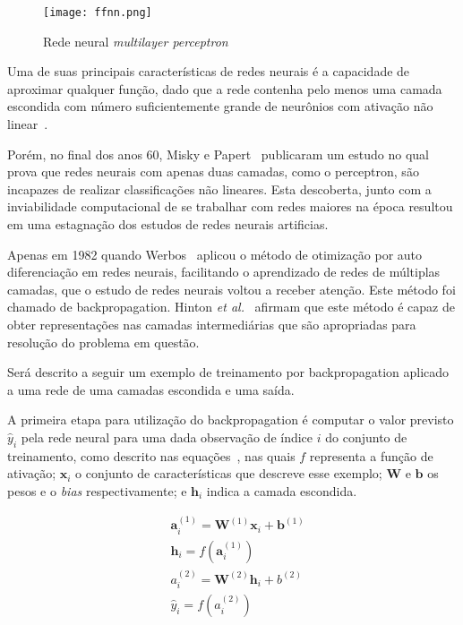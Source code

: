 \begin{figure}
\begin{center} {
    \begin{center}
    \texttt{[image: ffnn.png]}
    \caption{Rede neural \textit{multilayer perceptron}}
    \label{fig:ff-neural-net}
    \end{center}
}
\end{center}
\end{figure}

Uma de suas principais características de redes neurais é a capacidade de aproximar qualquer função, dado que a rede
contenha pelo menos uma camada escondida com número suficientemente grande de neurônios com ativação não
linear~\cite{hornik89}.

Porém, no final dos anos 60, Misky e Papert~\cite{minsky72} publicaram um estudo no qual prova que redes neurais com
apenas duas camadas, como o perceptron, são incapazes de realizar classificações não lineares.
Esta descoberta, junto com a inviabilidade computacional de se trabalhar com redes maiores na época resultou em uma
estagnação dos estudos de redes neurais artificias.

Apenas em 1982 quando Werbos~\cite{werbos82} aplicou o método de otimização por auto diferenciação em redes neurais,
facilitando o aprendizado de redes de múltiplas camadas, que o estudo de redes neurais voltou a receber atenção.
Este método foi chamado de backpropagation.
Hinton \textit{et al.}~\cite{williams86} afirmam que este método é capaz de obter representações nas camadas
intermediárias que são apropriadas para resolução do problema em questão.

Será descrito a seguir um exemplo de treinamento por backpropagation aplicado a uma rede de uma camadas escondida e uma
saída.

A primeira etapa para utilização do backpropagation é computar o valor previsto ${\hat{y}_i}$ pela rede neural para
uma dada observação de índice $i$ do conjunto de treinamento, como descrito nas
equações~, nas quais $f$ representa a função de ativação; $\mathbf{x}_i$ o
conjunto de características que descreve esse exemplo; $\mathbf{W}$ e $\mathbf{b}$ os pesos e o \textit{bias}
respectivamente; e $\mathbf{h}_i$ indica a camada escondida.

\begin{subequations} \label{eq:nn-forward}
\begin{align}
    &\mathbf{a}_i^{(1)} = \mathbf{W}^{(1)} \mathbf{x}_i + \mathbf{b}^{(1)} \label{eq:nn-forward-a1}\\
    &\mathbf{h}_i = f(\mathbf{a}_i^{(1)}) \label{eq:nn-forward-hidden}\\
    &a_i^{(2)} = \mathbf{W}^{(2)} \mathbf{h}_i + b^{(2)} \label{eq:nn-forward-a2}\\
    &\hat{y}_i = f(a_i^{(2)}) \label{eq:nn-forward-y}
\end{align}
\end{subequations}

